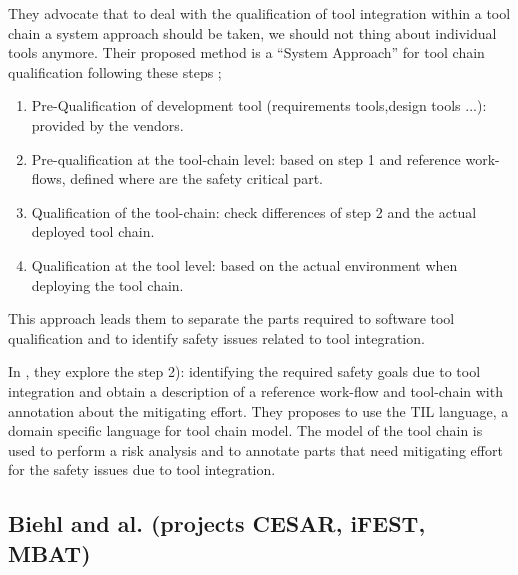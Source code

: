 \documentclass{openetcs_report}
\begin{document}
They advocate that to deal with the qualification of tool integration
within a tool chain a system approach should be taken, we should not
thing about individual tools anymore.  Their proposed method is a ``System
Approach'' for tool chain qualification following these steps ;
\begin{enumerate}
\item Pre-Qualification of development tool (requirements tools,design
  tools ...): provided by the vendors.
\item Pre-qualification at the tool-chain level: based on step 1 and
  reference work-flows, defined where are the safety critical part.
\item Qualification of the tool-chain: check differences of step 2 and
  the actual deployed tool chain.
\item Qualification at the tool level: based on the actual environment
  when deploying the tool chain.
\end{enumerate}
This approach leads them to separate the parts required to software tool
qualification and to identify safety issues related to tool integration.

In \cite{asplund_towards_2012}, they explore the step 2): identifying
the required safety goals due to tool integration and obtain a
description of a reference work-flow and tool-chain with annotation
about the mitigating effort.  They proposes to use the TIL language, a
domain specific language for tool chain model.  The model of the tool
chain is used to perform a risk analysis and to annotate parts
that need mitigating effort for the safety issues due to tool
integration. 

\subsection{Biehl and al. (projects CESAR, iFEST, MBAT)}
\label{sec-1-2.3}
\end{document}
